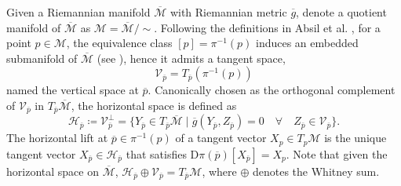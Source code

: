 \begin{definition}\label{def:horizontal_vertical_space}
    Given a Riemannian manifold $\overline{\mathcal{M}}$ with Riemannian metric $\overline{g}$, denote a quotient manifold of $\overline{\mathcal{M}}$ as $\mathcal{M}=\overline{\mathcal{M}}/\sim$. 
    Following the definitions in Absil et al. \cite[p.~43]{AbsilMahonySepulchre2008}, for a point $p\in \mathcal{M}$, the equivalence class $[p]=\pi^{-1}(p)$ induces an embedded submanifold of $\overline{\mathcal{M}}$ (see ), hence it admits a tangent space,
    \begin{equation*}
        \mathcal{V}_{\overline{p}}=T_{\overline{p}}(\pi^{-1}(p))
    \end{equation*}
    named the \textup{vertical space} at $\overline{p}$. Canonically chosen as the orthogonal complement of $\mathcal{V}_{\overline{p}}$ in $T_{\overline{p}}\overline{\mathcal{M}}$, the \textup{horizontal space} \cite[p.~48]{AbsilMahonySepulchre2008} is defined as %
    \begin{equation*}
        \mathcal{H}_{\overline{p}}\coloneqq \mathcal{V}_{\overline{p}}^\perp=\{Y_{\overline{p}}\in T_{\overline{p}}\overline{\mathcal{M}} \;|\; \overline{g}(Y_{\overline{p}},Z_{\overline{p}})=0\quad\forall\quad Z_{\overline{p}}\in \mathcal{V}_{\overline{p}} \}.
    \end{equation*}
    The \textup{horizontal lift} at $\overline{p}\in\pi^{-1}(p)$ of a tangent vector $X_{p}\in T_{p}\mathcal{M}$ is the unique tangent vector $X_{\overline{p}}\in \mathcal{H}_{\overline{p}}$ that satisfies $\mathrm{D}\pi(\overline{p})[{X}_{\overline{p}}]=X_p$. Note that given the horizontal space on $\overline{\mathcal{M}}$, $\mathcal{H}_{\overline{p}}\oplus \mathcal{V}_{\overline{p}}=T_{\overline{p}}\mathcal{M}$, where $\oplus$ denotes the Whitney sum. 
\end{definition}

